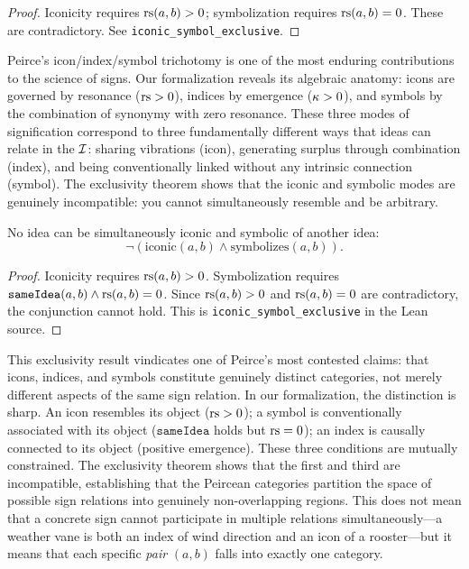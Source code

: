 \begin{proof}
Iconicity requires $\mathrm{rs}(a, b) > 0$; symbolization requires
$\mathrm{rs}(a, b) = 0$. These are contradictory. See
\texttt{iconic\_symbol\_exclusive}.
\end{proof}

\begin{interpretation}
Peirce's icon/index/symbol trichotomy is one of the most enduring
contributions to the science of signs. Our formalization reveals its
algebraic anatomy: icons are governed by resonance ($\mathrm{rs} > 0$), indices
by emergence ($\kappa > 0$), and symbols by the combination of
synonymy with zero resonance. These three modes of signification
correspond to three fundamentally different ways that ideas can relate
in the $\mathcal{I}$: sharing vibrations (icon), generating surplus through
combination (index), and being conventionally linked without any
intrinsic connection (symbol). The exclusivity theorem shows that
the iconic and symbolic modes are genuinely incompatible: you cannot
simultaneously resemble and be arbitrary.
\end{interpretation}

\begin{theorem}
\label{thm:icon-symbol-exclusive-v2}
No idea can be simultaneously iconic and symbolic of another idea:
\[
  \neg(\text{iconic}(a, b) \wedge \text{symbolizes}(a, b)).
\]
\end{theorem}

\begin{proof}
Iconicity requires $\mathrm{rs}(a, b) > 0$. Symbolization requires $\texttt{sameIdea}(a, b) \wedge \mathrm{rs}(a, b) = 0$. Since $\mathrm{rs}(a, b) > 0$ and $\mathrm{rs}(a, b) = 0$ are contradictory, the conjunction cannot hold. This is \texttt{iconic\_symbol\_exclusive} in the Lean source.
\end{proof}

\begin{interpretation}
This exclusivity result vindicates one of Peirce's most contested claims: that icons, indices, and symbols constitute genuinely distinct categories, not merely different aspects of the same sign relation. In our formalization, the distinction is sharp. An icon resembles its object ($\mathrm{rs} > 0$); a symbol is conventionally associated with its object ($\texttt{sameIdea}$ holds but $\mathrm{rs} = 0$); an index is causally connected to its object (positive emergence). These three conditions are mutually constrained. The exclusivity theorem shows that the first and third are incompatible, establishing that the Peircean categories partition the space of possible sign relations into genuinely non-overlapping regions. This does not mean that a concrete sign cannot participate in multiple relations simultaneously---a weather vane is both an index of wind direction and an icon of a rooster---but it means that each specific \emph{pair} $(a, b)$ falls into exactly one category.
\end{interpretation}

